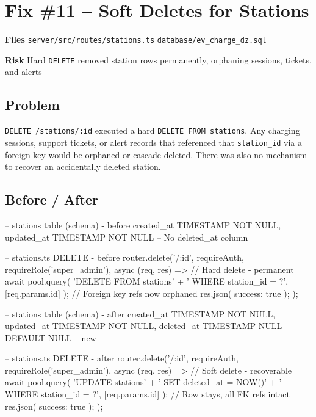 \documentclass[12pt,a4paper]{report}
\newcommand{\diffL}{\noindent\begin{minipage}[t]{0.485\linewidth}}
\newcommand{\diffR}{\end{minipage}\hfill\begin{minipage}[t]{0.485\linewidth}}
\newcommand{\diffend}{\end{minipage}\par\smallskip}
\newcommand{\inforow}[2]{%
	\noindent
	\begin{tcolorbox}[
		colback   = lightblue,
		colframe  = midblue,
		arc       = 2pt,
		left      = 6pt, right = 6pt, top = 2pt, bottom = 2pt,
		sidebyside, sidebyside align = top seam,
		lefthand width = 3.2cm,
		segmentation hidden,
		]
		\textbf{\color{brandblue}\small #1}
		\tcblower
		{\small\color{labelgray} #2}
	\end{tcolorbox}\vspace{2pt}%
}
\newcommand{\file}[1]{\texttt{\small #1}}
\begin{document}
	\section{Fix \#11 -- Soft Deletes for Stations}
	
	\inforow{Files}{\file{server/src/routes/stations.ts} \quad \file{database/ev\_charge\_dz.sql}}
	\inforow{Risk}{Hard \texttt{DELETE} removed station rows permanently, orphaning sessions, tickets, and alerts}
	
	\subsection*{Problem}
	
	\texttt{DELETE /stations/:id} executed a hard \texttt{DELETE FROM stations}.
	Any charging sessions, support tickets, or alert records that referenced that
	\texttt{station\_id} via a foreign key would be orphaned or cascade-deleted.
	There was also no mechanism to recover an accidentally deleted station.
	
	\subsection*{Before / After}
	
	\diffL
	\begin{beforecode}
		-- stations table (schema) - before
		created_at TIMESTAMP NOT NULL,
		updated_at TIMESTAMP NOT NULL
		-- No deleted_at column
		
		-- stations.ts DELETE - before
		router.delete('/:id',
		requireAuth,
		requireRole('super_admin'),
		async (req, res) => {
			// Hard delete - permanent
			await pool.query(
			'DELETE FROM stations'
			+ ' WHERE station_id = ?',
			[req.params.id]
			);
			// Foreign key refs now orphaned
			res.json({ success: true });
		});
	\end{beforecode}
	\diffR
	\begin{aftercode}
		-- stations table (schema) - after
		created_at TIMESTAMP NOT NULL,
		updated_at TIMESTAMP NOT NULL,
		deleted_at TIMESTAMP NULL
		DEFAULT NULL  -- new
		
		-- stations.ts DELETE - after
		router.delete('/:id',
		requireAuth,
		requireRole('super_admin'),
		async (req, res) => {
			// Soft delete - recoverable
			await pool.query(
			'UPDATE stations'
			+ ' SET deleted_at = NOW()'
			+ ' WHERE station_id = ?',
			[req.params.id]
			);
			// Row stays, all FK refs intact
			res.json({ success: true });
		});
	\end{aftercode}
	\diffend
	
\end{document}
